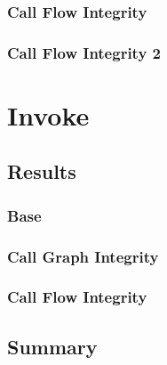 \subsubsection{Call Flow Integrity}

\subsubsection{Call Flow Integrity 2}


\section{Invoke}

\subsection*{Results}

\subsubsection{Base}

\subsubsection{Call Graph Integrity}

\subsubsection{Call Flow Integrity}

\subsection{Summary}



